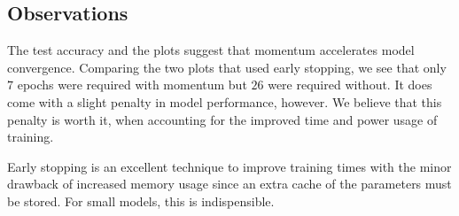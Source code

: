 \subsection{Observations}

The test accuracy and the plots suggest that momentum accelerates model convergence.
Comparing the two plots that used early stopping, we see that only $7$ epochs were required
with momentum but $26$ were required without. It does come with a slight penalty in model performance,
however. We believe that this penalty is worth it, when accounting for the improved time and power
usage of training.

Early stopping is an excellent  technique to improve training times with the minor drawback of increased memory usage
since an extra cache of the parameters must be stored. For small models, this is indispensible.
